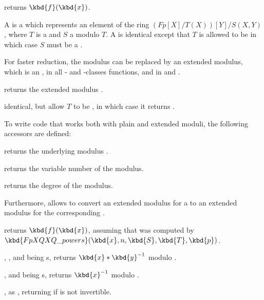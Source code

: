  returns
$\kbd{f}(\kbd{x})$.


A  is a  which represents an element of the ring
$(Fp[X]/T(X))[Y]/S(X,Y)$, where $T$ is a  and $S$ a 
modulo $T$.  A  is identical except that $T$ is allowed to be
 in which case $S$ must be a .


For faster reduction, the modulus  can be replaced by an extended
modulus, which is an , in all - and -classes
functions, and in  and .

 returns the extended modulus
.

 identical, but allow $T$ to
be , in which case it returns .

To write code that works both with plain and extended moduli, the following
accessors are defined:

 returns the underlying modulus .

 returns the variable number of the modulus.

 returns the degree of the modulus.

Furthermore,  allows to convert an extended modulus for
a  to an extended modulus for the corresponding .


 returns
$\kbd{f}(\kbd{x})$, assuming that  was computed by
$\kbd{FpXQXQ\_powers}(\kbd{x}, n, \kbd{S}, \kbd{T}, \kbd{p})$.

, ,  and
 being s, returns $\kbd{x}*\kbd{y}^{-1}$ modulo .

,  and
 being s, returns $\kbd{x}^{-1}$ modulo .

, as ,
returning  if  is not invertible.

